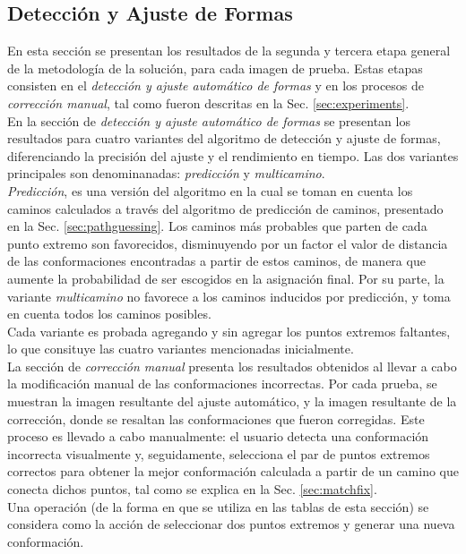 \subsection{Detecci\'on y Ajuste de Formas}

En esta secci\'on se presentan los resultados de la segunda y tercera
etapa general de la metodolog\'ia de la soluci\'on, para cada imagen de prueba.
Estas etapas consisten en el \emph{detecci\'on y ajuste autom\'atico de formas} y en los procesos 
de \emph{correcci\'on manual}, tal como fueron descritas en la Sec. \ref{sec:experiments}.\\

En la secci\'on de \emph{detecci\'on y ajuste autom\'atico de formas} se presentan los resultados
para cuatro variantes del algoritmo de detecci\'on y ajuste de formas, diferenciando
la precisi\'on del ajuste y el rendimiento en tiempo. Las dos variantes principales
son denominanadas: \emph{predicci\'on} y \emph{multicamino}.\\
\emph{Predicci\'on}, es una versi\'on del algoritmo en la cual se toman en cuenta 
los caminos calculados a trav\'es del algoritmo de predicci\'on de caminos, presentado
en la Sec. \ref{sec:pathguessing}. Los caminos m\'as probables que parten de cada punto
extremo son favorecidos, disminuyendo por un factor el valor de distancia de las
conformaciones encontradas a partir de estos caminos, de manera que aumente la 
probabilidad de ser escogidos en la asignaci\'on final. Por su parte, la variante 
\emph{multicamino} no favorece a los caminos inducidos por predicci\'on, y toma 
en cuenta todos los caminos posibles.\\
Cada variante es probada agregando y sin agregar los puntos extremos faltantes, lo
que consituye las cuatro variantes mencionadas inicialmente.\\

La secci\'on de \emph{correcci\'on manual} presenta los resultados obtenidos 
al llevar a cabo la modificaci\'on manual de las conformaciones incorrectas.
Por cada prueba, se muestran la imagen resultante del ajuste autom\'atico, 
y la imagen resultante de la correcci\'on, donde se resaltan las conformaciones
que fueron corregidas. Este proceso es llevado a cabo manualmente: el usuario
detecta una conformaci\'on incorrecta visualmente y, seguidamente, selecciona el
par de puntos extremos correctos para obtener la mejor conformaci\'on
calculada a partir de un camino que conecta dichos puntos, 
tal como se explica en la Sec. \ref{sec:matchfix}.\\
Una operaci\'on (de la forma en que se utiliza en las tablas de esta secci\'on)
se considera como la acci\'on de seleccionar dos puntos extremos y generar
una nueva conformaci\'on.\\

